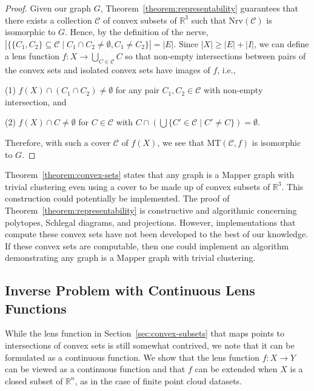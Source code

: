 \documentclass[reqno,oneside,11pt]{amsart}
\theoremstyle{definition}
\theoremstyle{remark}
\newcommand{\MT}{\text{MT}}
\def\R{\mathbb{R}}
\begin{document}
\begin{proof}
Given our graph $G$, Theorem~\ref{theorem:representability} guarantees that there exists a collection $\mathcal{C}$ of convex subsets of $\mathbb{R}^3$ such that $\mathrm{Nrv}(\mathcal{C})$ is isomorphic to $G$. Hence, by the definition of the nerve, $|\{ \{C_1,C_2\} \subseteq \mathcal{C}\mid C_1 \cap C_2 \neq \emptyset, C_1 \ne C_2\}|=|E|$. Since $|X| \geq |E|+|I|$, we can define a lens function $f \colon X \to \bigcup_{C\in \mathcal{C}} C$ so that non-empty intersections between pairs of the convex sets and isolated convex sets have images of $f$, i.e., 

(1) $f(X) \cap (C_1 \cap C_2) \neq \emptyset$ for any pair $C_1, C_2 \in \mathcal{C}$ with non-empty intersection, and 

(2) $f(X) \cap C \neq \emptyset$ for $C \in \mathcal{C}$ with $C \cap\left(\bigcup{ \{C' \in \mathcal{C} \mid C' \ne C \}}\right) =\emptyset$. 

Therefore, with such a cover $\mathcal{C}$ of $f(X)$, we see that $\MT(\mathcal{C}, f)$ is isomorphic to $G$.
\end{proof}

Theorem~\ref{theorem:convex-sets} states that any graph is a Mapper graph with trivial clustering even using a cover to be made up of convex subsets of $\R^3$. This construction could potentially be implemented. The proof of Theorem~\ref{theorem:representability} is constructive and algorithmic concerning polytopes, Schlegal diagrams, and projections. However, implementations that compute these convex sets have not been developed to the best of our knowledge. If these convex sets are computable, then one could implement an algorithm demonstrating any graph is a Mapper graph with trivial clustering.



\subsection{Inverse Problem with Continuous Lens Functions}\label{sec: continuous extensions}

While the lens function in Section~\ref{sec:convex-subsets} that maps points to intersections of convex sets is still somewhat contrived, we note that it can be formulated as a continuous function. We show that the lens function $f:X \to Y$ can be viewed as a continuous function and that $f$ can be extended when $X$ is a closed subset of $\R^n$, as in the case of finite point cloud datasets.
\end{document}
